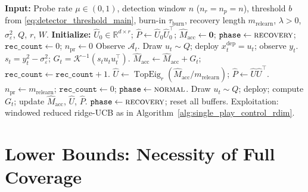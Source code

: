 \documentclass{article}
\newcommand{\R}{\mathbb{R}}
\newcommand{\cA}{\mathcal{A}}
\DeclareMathOperator{\TopEig}{TopEig}
\begin{document}
\begin{algorithm}[t]
  \caption{Adaptive Single-Play Subspace-Aware Control (Unknown Segment Boundaries)}
  \label{alg:adaptive_reset_control_main}
  \begin{algorithmic}[1]
  \State \textbf{Input:} Probe rate $\mu\in(0,1)$, detection window $n$ ($n_r=n_p=n$),
         threshold $b$ from \eqref{eq:detector_threshold_main},
         burn-in $\tau_{\mathrm{burn}}$, recovery length $m_{\mathrm{relearn}}$,
         $\lambda>0$, $\sigma_\varepsilon^2$, $Q$, $r$, $W$.
  \State \textbf{Initialize:} $\widehat U_0\in\R^{d\times r}$;
         $\widehat P\leftarrow\widehat U_0\widehat U_0^\top$;
         $\widehat M_{\mathrm{acc}}\leftarrow\mathbf{0}$;
         $\mathtt{phase}\leftarrow\textsc{recovery}$;
         $\mathtt{rec\_count}\leftarrow 0$; $n_{\mathrm{pr}}\leftarrow 0$
      \State Observe $\cA_t$.
          \State Draw $u_t\sim Q$; deploy $x_t^{\mathrm{dep}}=u_t$; observe $y_t$.
          \State $s_t = y_t^2-\sigma_\varepsilon^2$; $G_t = \mathcal{K}^{-1}(s_t u_t u_t^\top)$.
          \State $\widehat M_{\mathrm{acc}}\leftarrow \widehat M_{\mathrm{acc}}+G_t$; $\mathtt{rec\_count}\leftarrow\mathtt{rec\_count}+1$.
              \State $\widehat U\leftarrow\TopEig_r(\widehat M_{\mathrm{acc}}/m_{\mathrm{relearn}})$;
                     $\widehat P\leftarrow\widehat U\widehat U^\top$.
              \State $n_{\mathrm{pr}}\leftarrow m_{\mathrm{relearn}}$;
                     $\mathtt{rec\_count}\leftarrow 0$;
                     $\mathtt{phase}\leftarrow\textsc{normal}$.
          \EndIf
      \Else
              \State Draw $u_t\sim Q$; deploy; compute $G_t$; update $\widehat M_{\mathrm{acc}}$, $\widehat U$, $\widehat P$.
                  \State $\mathtt{phase}\leftarrow\textsc{recovery}$; reset all buffers.
              \EndIf
          \Else
              \State Exploitation: windowed reduced ridge-UCB as in Algorithm~\ref{alg:single_play_control_rdim}.
          \EndIf
      \EndIf
  \EndFor
  \end{algorithmic}
\end{algorithm}

\section{Lower Bounds: Necessity of Full Coverage}
\label{app:coverage_lower_bound}
\end{document}
